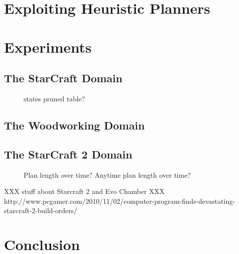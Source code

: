 \documentclass[letterpaper]{article}
\theoremstyle{plain} \newtheorem{theorem}{Theorem} \newtheorem{proposition}{Proposition} \newtheorem{lemma}{Lemma}
\theoremstyle{definition} \newtheorem{definition}{Definition} \newtheorem{conjecture}{Conjecture} \newtheorem*{example}{Example}
\theoremstyle{remark} \newtheorem*{remark}{Remark} \newtheorem*{note}{Note} \newtheorem{case}{Case}
\begin{document}
\section{Exploiting Heuristic Planners}

\section{Experiments}

\subsection{The StarCraft Domain}
\begin{figure}
  \caption{states pruned table?}
\end{figure}
\subsection{The Woodworking Domain}
\subsection{The StarCraft 2 Domain}
\begin{figure}
  \caption{Plan length over time? Anytime plan length over time?}
\end{figure}

XXX stuff about Starcraft 2 and Evo Chamber
XXX http://www.pcgamer.com/2010/11/02/computer-program-finds-devastating-starcraft-2-build-orders/

\section{Conclusion}



\end{document}
